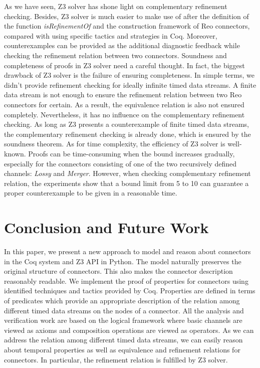 \documentclass[preprint,3p]{elsarticle}
\begin{document}
As we have seen, Z3 solver has shone light on complementary refinement checking. Besides, Z3 solver is much easier to make use of after the definition of the function \emph{isRefinementOf} and the construction framework of Reo connectors, compared with using specific tactics and strategies in Coq. Moreover, counterexamples can be provided as the additional diagnostic feedback while checking the refinement relation between two connectors.
Soundness and completeness of proofs in Z3 solver need a careful thought. In fact, the biggest drawback of Z3 solver is the failure of ensuring completeness. In simple terms, we didn't provide refinement checking for ideally infinite timed data streams.  A finite data stream is not enough to ensure the refinement relation between two Reo connectors for certain. As a result, the equivalence relation is also not ensured completely. Nevertheless, it has no influence on the complementary refinement checking. As long as Z3 presents a counterexample of finite timed data streams, the complementary refinement checking is already done, which is ensured by the soundness theorem.
As for time complexity, the efficiency of Z3 solver is well-known. Proofs can be time-consuming when the bound increases gradually, especially for the connectors consisting of one of the two recursively defined channels: \emph{Lossy} and \emph{Merger}. However, when checking complementary refinement relation, the experiments show that a bound limit from 5 to 10 can guarantee a proper counterexample to be given in a reasonable time.
\section{Conclusion and Future Work}\label{sec:conclusion}
In this paper, we present a new approach to model and reason about connectors in the Coq system and Z3 API in Python. The model naturally
preserves the original structure of connectors. This also makes the connector description reasonably readable. We
implement the proof of properties for connectors using identified techniques and tactics provided by Coq. Properties are
defined in terms of predicates which provide an appropriate description of the relation among different
timed data streams on the nodes of a connector. All the analysis and verification work are based on the logical framework
where basic channels are viewed as axioms and composition operations are viewed as operators. As we can address
the relation among different timed data streams, we can easily reason about temporal properties as well as equivalence
and refinement relations for connectors. In particular, the refinement relation is fulfilled by Z3 solver.
\end{document}
